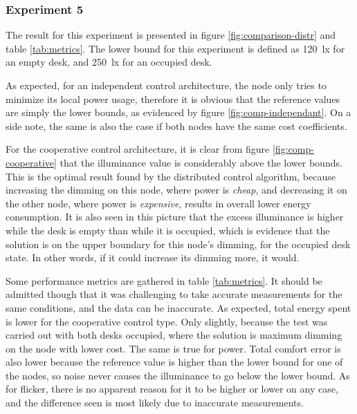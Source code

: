 \documentclass[english,fira]{ist-report}
\begin{document}
\subsubsection*{Experiment 5}

The result for this experiment is presented in figure \ref{fig:comparison-distr} and table \ref{tab:metrics}. The lower bound for this experiment is defined as \SI{120}{\lux} for an empty desk, and \SI{250}{\lux} for an occupied desk. 

As expected, for an independent control architecture, the node only tries to minimize its local power usage, therefore it is obvious that the reference values are simply the lower bounds, as evidenced by figure \ref{fig:comp-independant}. On a side note, the same is also the case if both nodes have the same cost coefficients.

For the cooperative control architecture, it is clear from figure \ref{fig:comp-cooperative} that the illuminance value is considerably above the lower bounds. This is the optimal result found by the distributed control algorithm, because increasing the dimming on this node, where power is \textit{cheap}, and decreasing it on the other node, where power is \textit{expensive}, results in overall lower energy consumption.
It is also seen in this picture that the excess illuminance is higher while the desk is empty than while it is occupied, which is evidence that the solution is on the upper boundary for this node's dimming, for the occupied desk state. In other words, if it could increase its dimming more, it would. 

Some performance metrics are gathered in table \ref{tab:metrics}. It should be admitted though that it was challenging to take accurate measurements for the same conditions, and the data can be inaccurate. As expected, total energy spent is lower for the cooperative control type. Only slightly, because the test was carried out with both desks occupied, where the solution is maximum dimming on the node with lower cost. The same is true for power. Total comfort error is also lower because the reference value is higher than the lower bound for one of the nodes, so noise never causes the illuminance to go below the lower bound. As for flicker, there is no apparent reason for it to be higher or lower on any case, and the difference seen is most likely due to inaccurate measurements.
\end{document}
